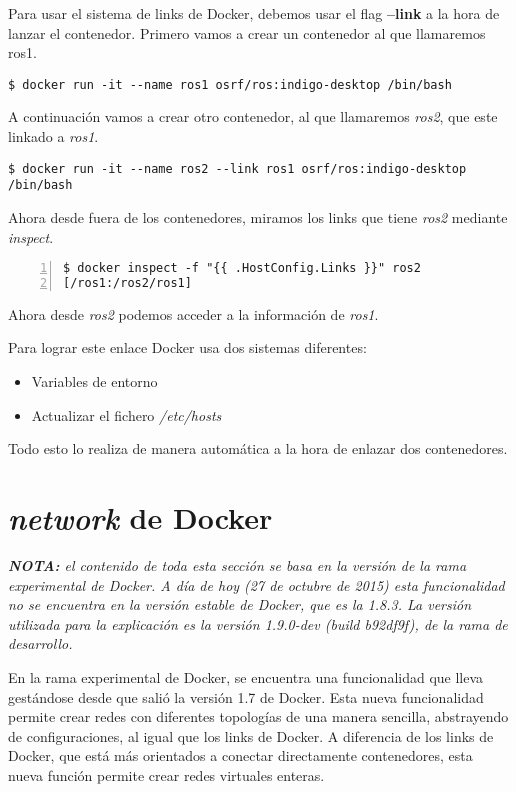 	Para usar el sistema de links de Docker, debemos usar el flag \textbf{--link} a la hora de lanzar el contenedor. Primero vamos a crear un contenedor al que llamaremos ros1.
	
	\begin{lstlisting}[style=consola]
$ docker run -it --name ros1 osrf/ros:indigo-desktop /bin/bash
	\end{lstlisting}
	
	A continuación vamos a crear otro contenedor, al que llamaremos \emph{ros2}, que este linkado a \emph{ros1}.
	
	\begin{lstlisting}[style=consola]
$ docker run -it --name ros2 --link ros1 osrf/ros:indigo-desktop /bin/bash
	\end{lstlisting}
	
	Ahora desde fuera de los contenedores, miramos los links que tiene \emph{ros2} mediante \emph{inspect}.
	
	\begin{lstlisting}[style=consola,numbers=left]
$ docker inspect -f "{{ .HostConfig.Links }}" ros2
[/ros1:/ros2/ros1]
	\end{lstlisting}
	
	Ahora desde \emph{ros2} podemos acceder a la información de \emph{ros1}.
	
	Para lograr este enlace Docker usa dos sistemas diferentes:
	
	\begin{itemize}
		\item Variables de entorno
		\item Actualizar el fichero \emph{/etc/hosts}
	\end{itemize}
	
	Todo esto lo realiza de manera automática a la hora de enlazar dos contenedores.
	
	\section{\textit{network} de Docker}
	
	\textit{\footnotesize \textbf{NOTA:} el contenido de toda esta sección se basa en la versión de la rama experimental de Docker. A día de hoy (27 de octubre de 2015) esta funcionalidad no se encuentra en la versión estable de Docker, que es la 1.8.3. La versión utilizada para la explicación es la versión 1.9.0-dev (build b92df9f), de la rama de desarrollo.}

	En la rama experimental de Docker, se encuentra una funcionalidad que lleva gestándose desde que salió la versión 1.7 de Docker. Esta nueva funcionalidad permite crear redes con diferentes topologías de una manera sencilla, abstrayendo de configuraciones, al igual que los links de Docker. A diferencia de los links de Docker, que está más orientados a conectar directamente contenedores, esta nueva función permite crear redes virtuales enteras.
	
